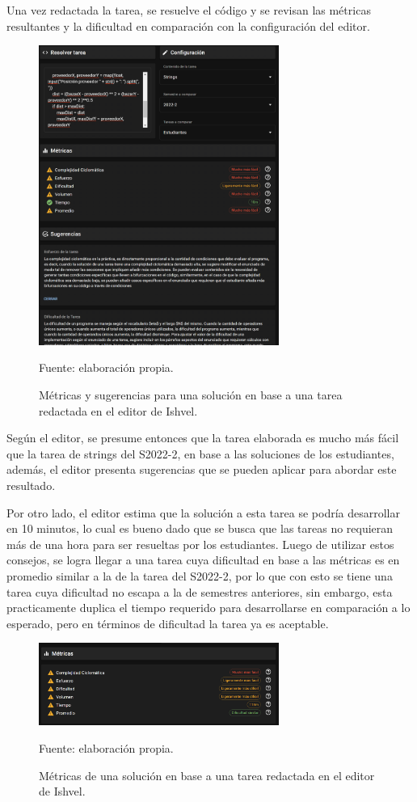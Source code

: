 \documentclass[letterpaper,12pt]{article}
\begin{document}
Una vez redactada la tarea, se resuelve el código y se revisan las métricas resultantes y la dificultad en comparación con la configuración del editor.
\begin{figure}[H]
  \centering
  \includegraphics[width=0.7\textwidth]{figures/redact5.png}
  \caption{Métricas y sugerencias para una solución en base a una tarea redactada en el editor de Ishvel.} Fuente: elaboración propia.
  \label{img:redact5}
\end{figure}
Según el editor, se presume entonces que la tarea elaborada es mucho más fácil que la tarea de strings del S2022-2, en base a las soluciones de los estudiantes, además, el editor presenta sugerencias que se pueden aplicar para abordar este resultado.

Por otro lado, el editor estima que la solución a esta tarea se podría desarrollar en 10 minutos, lo cual es bueno dado que se busca que las tareas no requieran más de una hora para ser resueltas por los estudiantes. Luego de utilizar estos consejos, se logra llegar a una tarea cuya dificultad en base a las métricas es en promedio similar a la de la tarea del S2022-2, por lo que con esto se tiene una tarea cuya dificultad no escapa a la de semestres anteriores, sin embargo, esta practicamente duplica el tiempo requerido para desarrollarse en comparación a lo esperado, pero en términos de dificultad la tarea ya es aceptable.
\begin{figure}[H]
  \centering
  \includegraphics[width=0.7\textwidth]{figures/redact6.png}
  \caption{Métricas de una solución en base a una tarea redactada en el editor de Ishvel.} Fuente: elaboración propia.
  \label{img:redact6}
\end{figure}
\end{document}
